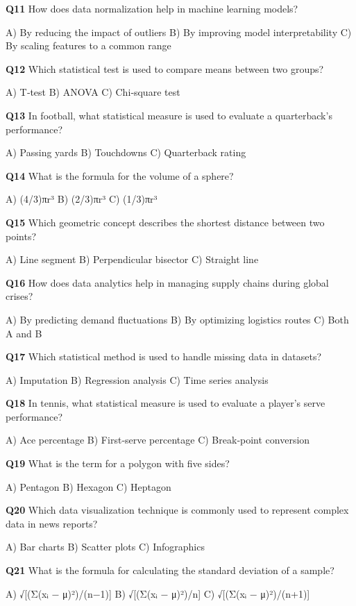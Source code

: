 \textbf{Q11} How does data normalization help in machine learning models?\par
    A) By reducing the impact of outliers  
    B) By improving model interpretability  
    C) By scaling features to a common range

\textbf{Q12} Which statistical test is used to compare means between two groups?\par
    A) T‑test  
    B) ANOVA  
    C) Chi‑square test

\textbf{Q13} In football, what statistical measure is used to evaluate a quarterback's performance?\par
    A) Passing yards  
    B) Touchdowns  
    C) Quarterback rating

\textbf{Q14} What is the formula for the volume of a sphere?\par
    A) (4/3)πr³  
    B) (2/3)πr³  
    C) (1/3)πr³

\textbf{Q15} Which geometric concept describes the shortest distance between two points?\par
    A) Line segment  
    B) Perpendicular bisector  
    C) Straight line

\textbf{Q16} How does data analytics help in managing supply chains during global crises?\par
    A) By predicting demand fluctuations  
    B) By optimizing logistics routes  
    C) Both A and B

\textbf{Q17} Which statistical method is used to handle missing data in datasets?\par
    A) Imputation  
    B) Regression analysis  
    C) Time series analysis

\textbf{Q18} In tennis, what statistical measure is used to evaluate a player's serve performance?\par
    A) Ace percentage  
    B) First‑serve percentage  
    C) Break‑point conversion

\textbf{Q19} What is the term for a polygon with five sides?\par
    A) Pentagon  
    B) Hexagon  
    C) Heptagon

\textbf{Q20} Which data visualization technique is commonly used to represent complex data in news reports?\par
    A) Bar charts  
    B) Scatter plots  
    C) Infographics

\textbf{Q21} What is the formula for calculating the standard deviation of a sample?\par
    A) √[(Σ(xᵢ − μ)²)/(n−1)]  
    B) √[(Σ(xᵢ − μ)²)/n]  
    C) √[(Σ(xᵢ − μ)²)/(n+1)]


